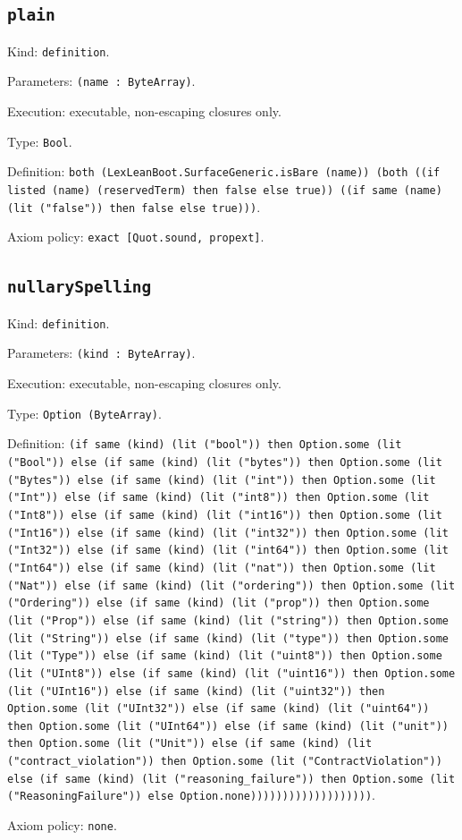 \documentclass[11pt]{article}
\begin{document}
\subsection*{\texttt{plain}}
\noindent Kind: \texttt{definition}.\par
\noindent Parameters: \texttt{(name : ByteArray)}.\par
\noindent Execution: executable, non-escaping closures only.\par
\noindent Type: \texttt{Bool}.\par
\noindent Definition: \texttt{both (LexLeanBoot.SurfaceGeneric.isBare (name)) (both ((if listed (name) (reservedTerm) then false else true)) ((if same (name) (lit ("false")) then false else true)))}.\par
\noindent Axiom policy: \texttt{exact [Quot.sound, propext]}.\par
\subsection*{\texttt{nullarySpelling}}
\noindent Kind: \texttt{definition}.\par
\noindent Parameters: \texttt{(kind : ByteArray)}.\par
\noindent Execution: executable, non-escaping closures only.\par
\noindent Type: \texttt{Option (ByteArray)}.\par
\noindent Definition: \texttt{(if same (kind) (lit ("bool")) then Option.some (lit ("Bool")) else (if same (kind) (lit ("bytes")) then Option.some (lit ("Bytes")) else (if same (kind) (lit ("int")) then Option.some (lit ("Int")) else (if same (kind) (lit ("int8")) then Option.some (lit ("Int8")) else (if same (kind) (lit ("int16")) then Option.some (lit ("Int16")) else (if same (kind) (lit ("int32")) then Option.some (lit ("Int32")) else (if same (kind) (lit ("int64")) then Option.some (lit ("Int64")) else (if same (kind) (lit ("nat")) then Option.some (lit ("Nat")) else (if same (kind) (lit ("ordering")) then Option.some (lit ("Ordering")) else (if same (kind) (lit ("prop")) then Option.some (lit ("Prop")) else (if same (kind) (lit ("string")) then Option.some (lit ("String")) else (if same (kind) (lit ("type")) then Option.some (lit ("Type")) else (if same (kind) (lit ("uint8")) then Option.some (lit ("UInt8")) else (if same (kind) (lit ("uint16")) then Option.some (lit ("UInt16")) else (if same (kind) (lit ("uint32")) then Option.some (lit ("UInt32")) else (if same (kind) (lit ("uint64")) then Option.some (lit ("UInt64")) else (if same (kind) (lit ("unit")) then Option.some (lit ("Unit")) else (if same (kind) (lit ("contract\_violation")) then Option.some (lit ("ContractViolation")) else (if same (kind) (lit ("reasoning\_failure")) then Option.some (lit ("ReasoningFailure")) else Option.none)))))))))))))))))))}.\par
\noindent Axiom policy: \texttt{none}.\par
\end{document}
